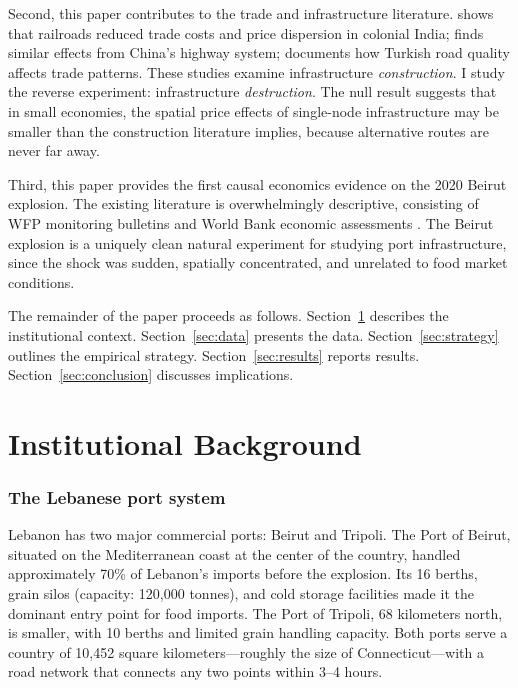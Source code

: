 \documentclass[12pt]{article}
\begin{document}
Second, this paper contributes to the trade and infrastructure literature. \citet{donaldson2018railroads} shows that railroads reduced trade costs and price dispersion in colonial India; \citet{faber2014trade} finds similar effects from China's highway system; \citet{cosar2016domestic} documents how Turkish road quality affects trade patterns. These studies examine infrastructure \textit{construction}. I study the reverse experiment: infrastructure \textit{destruction}. The null result suggests that in small economies, the spatial price effects of single-node infrastructure may be smaller than the construction literature implies, because alternative routes are never far away.

Third, this paper provides the first causal economics evidence on the 2020 Beirut explosion. The existing literature is overwhelmingly descriptive, consisting of WFP monitoring bulletins \citep{wfp2020lebanon} and World Bank economic assessments \citep{world2020lebanon}. The Beirut explosion is a uniquely clean natural experiment for studying port infrastructure, since the shock was sudden, spatially concentrated, and unrelated to food market conditions.

The remainder of the paper proceeds as follows. Section~\ref{sec:background} describes the institutional context. Section~\ref{sec:data} presents the data. Section~\ref{sec:strategy} outlines the empirical strategy. Section~\ref{sec:results} reports results. Section~\ref{sec:conclusion} discusses implications.

\section{Institutional Background}\label{sec:background}

\subsubsection*{The Lebanese port system} Lebanon has two major commercial ports: Beirut and Tripoli. The Port of Beirut, situated on the Mediterranean coast at the center of the country, handled approximately 70\% of Lebanon's imports before the explosion. Its 16 berths, grain silos (capacity: 120,000 tonnes), and cold storage facilities made it the dominant entry point for food imports. The Port of Tripoli, 68 kilometers north, is smaller, with 10 berths and limited grain handling capacity. Both ports serve a country of 10,452 square kilometers---roughly the size of Connecticut---with a road network that connects any two points within 3--4 hours.
\end{document}
